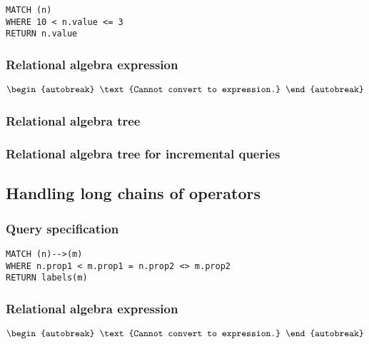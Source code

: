 \begin{lstlisting}
MATCH (n)
WHERE 10 < n.value <= 3
RETURN n.value
\end{lstlisting}

\subsubsection*{Relational algebra expression}

\begin{align*}
\begin{autobreak}
\text{Cannot convert to expression.}
\end{autobreak}
\end{align*}

\subsubsection*{Relational algebra tree}


\subsubsection*{Relational algebra tree for incremental queries}


\subsection{Handling long chains of operators}

\subsubsection*{Query specification}

\begin{lstlisting}
MATCH (n)-->(m)
WHERE n.prop1 < m.prop1 = n.prop2 <> m.prop2
RETURN labels(m)
\end{lstlisting}

\subsubsection*{Relational algebra expression}

\begin{align*}
\begin{autobreak}
\text{Cannot convert to expression.}
\end{autobreak}
\end{align*}


